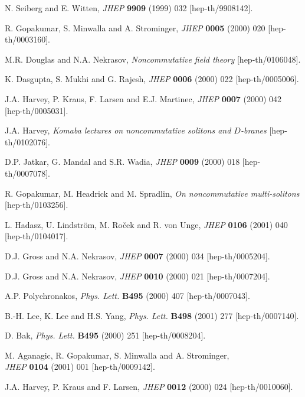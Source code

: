 \documentclass[a4paper,11pt]{article}
\numberwithin{equation}{section}
\begin{document}
\bigskip


\begin{thebibliography}{99}

N. Seiberg and E. Witten,
{\sl JHEP} {\bf 9909} (1999) 032 [hep-th/9908142].

R. Gopakumar, S. Minwalla and A. Strominger,
{\sl JHEP} {\bf 0005} (2000) 020 [hep-th/0003160].

M.R. Douglas and N.A. Nekrasov,
{\it Noncommutative field theory} [hep-th/0106048].

K. Dasgupta, S. Mukhi and G. Rajesh,
{\sl JHEP} {\bf 0006} (2000) 022 [hep-th/0005006].

J.A. Harvey, P. Kraus, F. Larsen and E.J. Martinec,
{\sl JHEP} {\bf 0007} (2000) 042 [hep-th/0005031].

J.A. Harvey,
{\it Komaba lectures on noncommutative solitons and $D$-branes}
[hep-th/0102076].

D.P. Jatkar, G. Mandal and S.R. Wadia,
{\sl JHEP} {\bf 0009} (2000) 018 [hep-th/0007078].

R. Gopakumar, M. Headrick and M. Spradlin,
{\it On noncommutative multi-solitons}\\{}
[hep-th/0103256].

L. Hadasz, U. Lindstr\"om, M. Ro\v cek and R. von Unge,
{\sl JHEP} {\bf 0106} (2001) 040
[hep-th/0104017].

D.J. Gross and N.A. Nekrasov,
{\sl JHEP} {\bf 0007} (2000) 034 [hep-th/0005204].

D.J. Gross and N.A. Nekrasov,
{\sl JHEP} {\bf 0010} (2000) 021 [hep-th/0007204].

A.P. Polychronakos,
{\sl Phys. Lett.} {\bf B495} (2000) 407 [hep-th/0007043].

B.-H. Lee, K. Lee and H.S. Yang,
{\sl Phys. Lett.} {\bf B498} (2001) 277 [hep-th/0007140].

D. Bak,
{\sl Phys. Lett.} {\bf B495} (2000) 251 [hep-th/0008204].

M. Aganagic, R. Gopakumar, S. Minwalla and A. Strominger, \\
{\sl JHEP} {\bf 0104} (2001) 001 [hep-th/0009142].

J.A. Harvey, P. Kraus and F. Larsen,
{\sl JHEP} {\bf 0012} (2000) 024 [hep-th/0010060].


\end{thebibliography}
\end{document}
